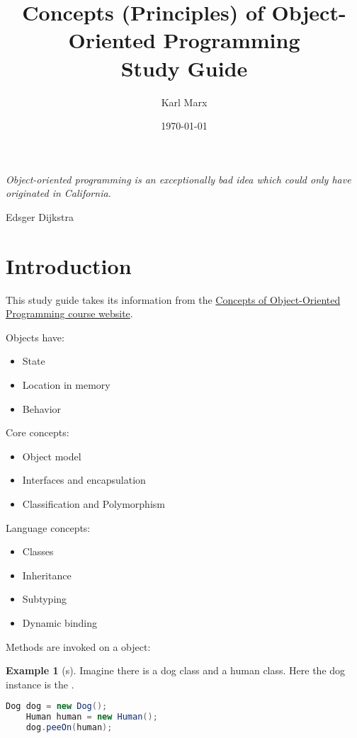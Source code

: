 \documentclass{article}
\title{Concepts (Principles) of Object-Oriented Programming \\ Study Guide}
\author{Karl Marx}
\date{\today}
\begin{document}
\theoremstyle{definition}
\newtheorem{definition}{Definition}[section]

\newtheorem{example}{Example}[section]

\maketitle

\epigraph{\itshape Object-oriented programming is an exceptionally bad idea which could only have originated in California.}{Edsger Dijkstra}

\tableofcontents

\section{Introduction}

This study guide takes its information from the \href{https://www.pm.inf.ethz.ch/education/courses/COOP.html}{Concepts of Object-Oriented Programming course website}.

Objects have:
\begin{itemize}
    \item State
    \item Location in memory
    \item Behavior
\end{itemize}

Core concepts:
\begin{itemize}
    \item Object model
    \item Interfaces and encapsulation
    \item Classification and Polymorphism
\end{itemize}

Language concepts:
\begin{itemize}
    \item Classes
    \item Inheritance
    \item Subtyping
    \item Dynamic binding
\end{itemize}

Methods are invoked on a \receiver{} object:
\begin{example}[\receiver{}s]
Imagine there is a dog class and a human class. Here the dog instance is the \receiver{}.
\begin{lstlisting}[language=Java]
    Dog dog = new Dog();
    Human human = new Human();
    dog.peeOn(human);
\end{lstlisting}
\end{example}
\end{document}
